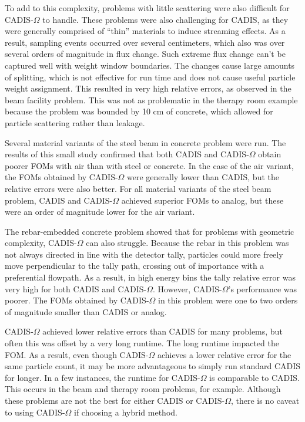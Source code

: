 To add to this complexity, problems with little scattering were also
difficult for CADIS-$\Omega$ to handle. These problems were also challenging for
CADIS, as they were generally comprised of ``thin'' materials to induce
streaming effects. As a result, sampling events occurred over several
centimeters, which also was over several orders of magnitude in flux change.
Such extreme flux change can't be captured well with weight window boundaries. 
The changes cause large amounts of splitting, which is not effective for run time
and does not cause useful particle weight assignment.
This resulted in very high relative errors, as observed in the beam facility
problem. This was not as problematic in the therapy room example because the
problem was bounded by 10 cm of concrete, which allowed for particle scattering
rather than leakage.

Several material variants of the steel beam in concrete problem were run. The
results of this small study confirmed that both CADIS and CADIS-$\Omega$ obtain
poorer FOMs with air than with steel or concrete. In the case of the air
variant, the FOMs obtained by CADIS-$\Omega$ were generally lower than CADIS,
but the relative errors were also better. For all material variants of the steel
beam problem, CADIS and CADIS-$\Omega$ achieved superior FOMs to 
analog, but these were an order of magnitude lower for the air variant.

The rebar-embedded concrete problem showed that for problems with
geometric complexity, CADIS-$\Omega$ can also struggle. Because the rebar in
this problem was not always directed in line with the detector tally, particles
could more freely move perpendicular to the tally path, crossing out of
importance with a preferential flowpath. As a result, in high energy bins the
tally relative error was very high for both CADIS and CADIS-$\Omega$. However,
CADIS-$\Omega$'s performance was poorer. The FOMs obtained by CADIS-$\Omega$ in
this problem were one to two orders of magnitude smaller than CADIS or analog.

CADIS-$\Omega$ achieved lower relative errors than CADIS for many problems, but
often this was offset by a very long runtime. The long runtime impacted the FOM.
As a result, even though CADIS-$\Omega$ achieves a lower relative error for the
same particle count, it may be more advantageous to simply run standard CADIS
for longer. In a few instances, the runtime for CADIS-$\Omega$ is comparable to
CADIS. This occurs in the beam and therapy room problems, for example. Although
these problems are not the best for either CADIS or CADIS-$\Omega$, there is no
caveat to using CADIS-$\Omega$ if choosing a hybrid method.

